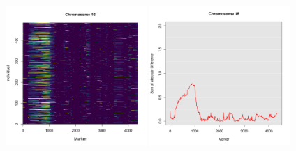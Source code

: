 \documentclass[12pt,t]{beamer}
\begin{document}
	\begin{frame}
		\begin{figure}
			\vspace{0.4in}
			{\includegraphics[height=2.8in, width=2.1in]{figures/heatmap16.png}}
			{\includegraphics[height=2.8in, width=2.1in]{figures/agg_marker_16.pdf}}
		\end{figure}		
	\end{frame}


	
\end{document}
